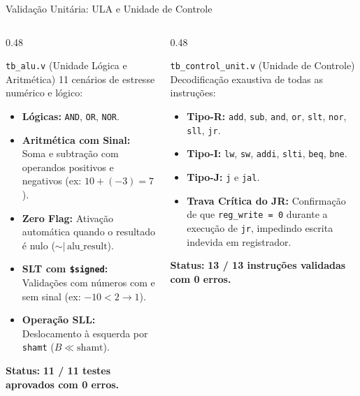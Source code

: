 \documentclass[aspectratio=169, 11pt]{beamer}
\begin{document}
\begin{frame}{Validação Unitária: ULA e Unidade de Controle}
  \begin{columns}[T]
    \begin{column}{0.48\textwidth}
      \begin{block}{\texttt{tb\_alu.v} (Unidade Lógica e Aritmética)}
        \small
        11 cenários de estresse numérico e lógico:
        \begin{itemize}\setlength{\itemsep}{4pt}
          \item \textbf{Lógicas:} \texttt{AND}, \texttt{OR}, \texttt{NOR}.
          \item \textbf{Aritmética com Sinal:} Soma e subtração com operandos positivos e negativos (ex: $10 + (-3) = 7$).
          \item \textbf{Zero Flag:} Ativação automática quando o resultado é nulo ($\sim|\,\text{alu\_result}$).
          \item \textbf{SLT com \texttt{\$signed}:} Validações com números com e sem sinal (ex: $-10 < 2 \rightarrow 1$).
          \item \textbf{Operação SLL:} Deslocamento à esquerda por \texttt{shamt} ($B \ll \text{shamt}$).
        \end{itemize}
        \textbf{Status:} \textcolor{passgreen}{\textbf{11 / 11 testes aprovados com 0 erros.}}
      \end{block}
    \end{column}

    \begin{column}{0.48\textwidth}
      \begin{block}{\texttt{tb\_control\_unit.v} (Unidade de Controle)}
        \small
        Decodificação exaustiva de todas as instruções:
        \begin{itemize}\setlength{\itemsep}{4pt}
          \item \textbf{Tipo-R:} \texttt{add}, \texttt{sub}, \texttt{and}, \texttt{or}, \texttt{slt}, \texttt{nor}, \texttt{sll}, \texttt{jr}.
          \item \textbf{Tipo-I:} \texttt{lw}, \texttt{sw}, \texttt{addi}, \texttt{slti}, \texttt{beq}, \texttt{bne}.
          \item \textbf{Tipo-J:} \texttt{j} e \texttt{jal}.
          \item \textbf{Trava Crítica do JR:} Confirmação de que \texttt{reg\_write = 0} durante a execução de \texttt{jr}, impedindo escrita indevida em registrador.
        \end{itemize}
        \textbf{Status:} \textcolor{passgreen}{\textbf{13 / 13 instruções validadas com 0 erros.}}
      \end{block}
    \end{column}
  \end{columns}
\end{frame}
\end{document}
